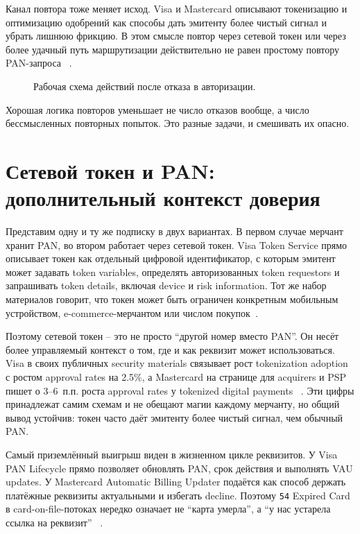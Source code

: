 Канал повтора тоже меняет исход. Visa и Mastercard описывают
токенизацию и оптимизацию одобрений как способы дать эмитенту более
чистый сигнал и убрать лишнюю фрикцию. В этом смысле повтор через
сетевой токен или через более удачный путь маршрутизации действительно
не равен простому повтору PAN-запроса
~\cite{visa-vts}\cite{visa-tokenization-security}\cite{mc-acquirers-psps}\cite{mc-pop}.

\begin{figure}
  \centering
  \caption{Рабочая схема действий после отказа в авторизации.}
  \label{fig:decline-retry-tree}
\end{figure}

Хорошая логика повторов уменьшает не число отказов вообще, а число
бессмысленных повторных попыток. Это разные задачи, и смешивать их
опасно.

\section{Сетевой токен и PAN: дополнительный контекст доверия}
\label{sec:decline-tokens}

Представим одну и ту же подписку в двух вариантах. В первом случае
мерчант хранит PAN, во втором работает через сетевой токен. Visa Token
Service прямо описывает токен как отдельный цифровой идентификатор, с
которым эмитент может задавать token variables, определять авторизованных
token requestors и запрашивать token details, включая device и risk
information. Тот же набор материалов говорит, что токен может быть
ограничен конкретным мобильным устройством, e-commerce-мерчантом или
числом покупок~\cite{visa-vts}\cite{emvco-payment-tokenisation-guide}.

Поэтому сетевой токен -- это не просто \enquote{другой номер вместо
PAN}. Он несёт более управляемый контекст о том, где и как реквизит
может использоваться. Visa в своих публичных security materials
связывает рост tokenization adoption с ростом approval rates на 2.5\%, а
Mastercard на странице для acquirers и PSP пишет о 3--6~п.п. роста
approval rates у tokenized digital payments
~\cite{visa-tokenization-security}\cite{mc-acquirers-psps}. Эти
цифры принадлежат самим схемам и не обещают магии каждому мерчанту, но
общий вывод устойчив: токен часто даёт эмитенту более чистый сигнал,
чем обычный PAN.

Самый приземлённый выигрыш виден в жизненном цикле реквизитов. У Visa PAN
Lifecycle прямо позволяет обновлять PAN, срок действия и выполнять VAU
updates. У Mastercard Automatic Billing Updater подаётся как способ
держать платёжные реквизиты актуальными и избегать decline.
Поэтому \texttt{54} Expired Card в card-on-file-потоках нередко означает не
\enquote{карта умерла}, а \enquote{у нас устарела ссылка на реквизит}
~\cite{visa-vts}\cite{visa-vau}\cite{mc-bill-pay-solutions}.

